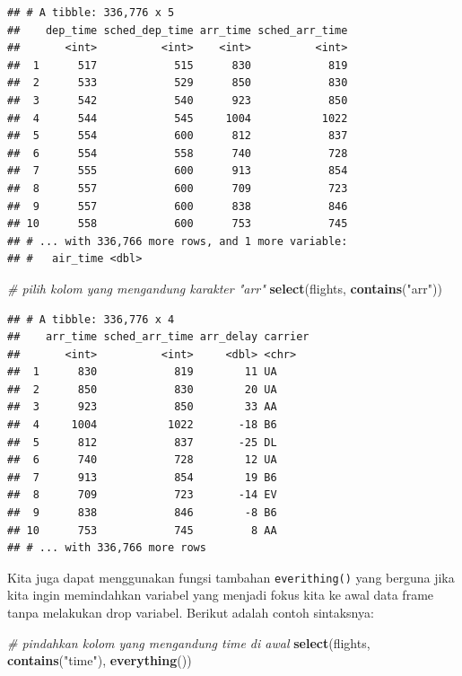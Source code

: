\documentclass[]{book}
\newenvironment{Shaded}{\begin{snugshade}}{\end{snugshade}}
\newcommand{\KeywordTok}[1]{\textcolor[rgb]{0.13,0.29,0.53}{\textbf{#1}}}
\newcommand{\StringTok}[1]{\textcolor[rgb]{0.31,0.60,0.02}{#1}}
\newcommand{\CommentTok}[1]{\textcolor[rgb]{0.56,0.35,0.01}{\textit{#1}}}
\newcommand{\NormalTok}[1]{#1}
\begin{document}
\begin{verbatim}
## # A tibble: 336,776 x 5
##    dep_time sched_dep_time arr_time sched_arr_time
##       <int>          <int>    <int>          <int>
##  1      517            515      830            819
##  2      533            529      850            830
##  3      542            540      923            850
##  4      544            545     1004           1022
##  5      554            600      812            837
##  6      554            558      740            728
##  7      555            600      913            854
##  8      557            600      709            723
##  9      557            600      838            846
## 10      558            600      753            745
## # ... with 336,766 more rows, and 1 more variable:
## #   air_time <dbl>
\end{verbatim}

\begin{Shaded}
\begin{Highlighting}[]
\CommentTok{# pilih kolom yang mengandung karakter "arr"}
\KeywordTok{select}\NormalTok{(flights, }\KeywordTok{contains}\NormalTok{(}\StringTok{"arr"}\NormalTok{))}
\end{Highlighting}
\end{Shaded}

\begin{verbatim}
## # A tibble: 336,776 x 4
##    arr_time sched_arr_time arr_delay carrier
##       <int>          <int>     <dbl> <chr>  
##  1      830            819        11 UA     
##  2      850            830        20 UA     
##  3      923            850        33 AA     
##  4     1004           1022       -18 B6     
##  5      812            837       -25 DL     
##  6      740            728        12 UA     
##  7      913            854        19 B6     
##  8      709            723       -14 EV     
##  9      838            846        -8 B6     
## 10      753            745         8 AA     
## # ... with 336,766 more rows
\end{verbatim}

Kita juga dapat menggunakan fungsi tambahan \texttt{everithing()} yang
berguna jika kita ingin memindahkan variabel yang menjadi fokus kita ke
awal data frame tanpa melakukan drop variabel. Berikut adalah contoh
sintaksnya:

\begin{Shaded}
\begin{Highlighting}[]
\CommentTok{# pindahkan kolom yang mengandung time di awal}
\KeywordTok{select}\NormalTok{(flights, }\KeywordTok{contains}\NormalTok{(}\StringTok{"time"}\NormalTok{), }\KeywordTok{everything}\NormalTok{())}
\end{Highlighting}
\end{Shaded}
\end{document}
